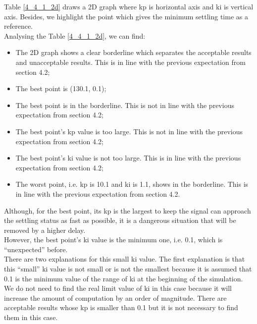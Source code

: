\documentclass{report}
\begin{document}
Table \textcolor{red}{\ref{4_4_1_2d}} draws a 2D graph where kp is horizontal axis and ki is vertical axis. Besides, we highlight the point which gives the minimum settling time as a reference.\\

Analysing the Table \textcolor{red}{\ref{4_4_1_2d}}, we can find:\\

\begin{itemize}
\item The 2D graph shows a clear borderline which separates the acceptable results and unacceptable results. This is in line with the previous expectation from section 4.2;\\

\item The best point is (130.1, 0.1);\\

\item The best point is in the borderline.  This is not in line with the previous expectation from section 4.2;\\

\item The best point’s kp value is too large. This is not in line with the previous expectation from section 4.2;\\

\item The best point’s ki value is not too large.  This is in line with the previous expectation from section 4.2;\\

\item The worst point, i.e. kp is 10.1 and ki is 1.1, shows in the borderline. This is in line with the previous expectation from section 4.2.\\
\end{itemize}

Although, for the best point, its kp is the largest to keep the signal can approach the settling status as fast as possible, it is a dangerous situation that will be removed by a higher delay.\\

However, the best point’s ki value is the minimum one, i.e. 0.1, which is “unexpected” before. \\

There are two explanations for this small ki value. The first explanation is that this “small” ki value is not small or is not the smallest because it is assumed that 0.1 is the minimum value of the range of ki at the beginning of the simulation. We do not need to find the real limit value of ki in this case because it will increase the amount of computation by an order of magnitude. There are acceptable results whose kp is smaller than 0.1 but it is not necessary to find them in this case. \\
\end{document}
